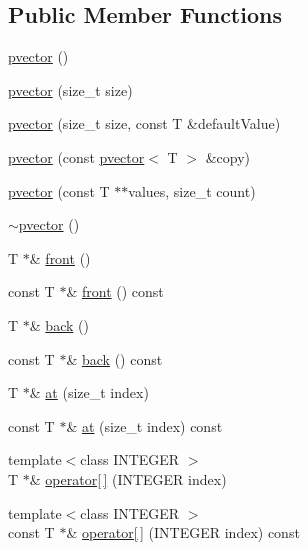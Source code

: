 \subsection*{Public Member Functions}
\begin{DoxyCompactItemize}
\item 
\hyperlink{classfm_1_1pvector_aa64cc8b984d42c4706c0d87a9ed64e16}{pvector} ()
\item 
\hyperlink{classfm_1_1pvector_a15d6f6b0ccb199446ffc8a9ddf99d1f6}{pvector} (size\_\-t size)
\item 
\hyperlink{classfm_1_1pvector_a20ca8eef950b9150aea0964b6ab48ea4}{pvector} (size\_\-t size, const T \&defaultValue)
\item 
\hyperlink{classfm_1_1pvector_a7ecbc0a6fc772b65d4d2c461ccca83e1}{pvector} (const \hyperlink{classfm_1_1pvector}{pvector}$<$ T $>$ \&copy)
\item 
\hyperlink{classfm_1_1pvector_a3c784b9bf309ebc38097039b2831d392}{pvector} (const T $\ast$$\ast$values, size\_\-t count)
\item 
\hyperlink{classfm_1_1pvector_aa5f502362d9aeb8d720894a0ae704997}{$\sim$pvector} ()
\item 
T $\ast$\& \hyperlink{classfm_1_1pvector_a46e6896021446dfe203282f47a0dd909}{front} ()
\item 
const T $\ast$\& \hyperlink{classfm_1_1pvector_aa998f3d026a909a3c7b9c399ea8e37b6}{front} () const 
\item 
T $\ast$\& \hyperlink{classfm_1_1pvector_a00ce55b4d58288b3017e4b9d2df4260a}{back} ()
\item 
const T $\ast$\& \hyperlink{classfm_1_1pvector_adc9a569e622ea996ac7f0ef69db47229}{back} () const 
\item 
T $\ast$\& \hyperlink{classfm_1_1pvector_a2902df0f55838938b142a8baed323b36}{at} (size\_\-t index)
\item 
const T $\ast$\& \hyperlink{classfm_1_1pvector_aa9dfd45e9eba32380ab41371d3a49a02}{at} (size\_\-t index) const 
\item 
{\footnotesize template$<$class INTEGER $>$ }\\T $\ast$\& \hyperlink{classfm_1_1pvector_a871661013711b1b0eed58ec3ee85d042}{operator\mbox{[}$\,$\mbox{]}} (INTEGER index)
\item 
{\footnotesize template$<$class INTEGER $>$ }\\const T $\ast$\& \hyperlink{classfm_1_1pvector_a21285efb6e9b7724c852c2669f7c085e}{operator\mbox{[}$\,$\mbox{]}} (INTEGER index) const 
\item 
$$
\end{DoxyCompactItemize}
